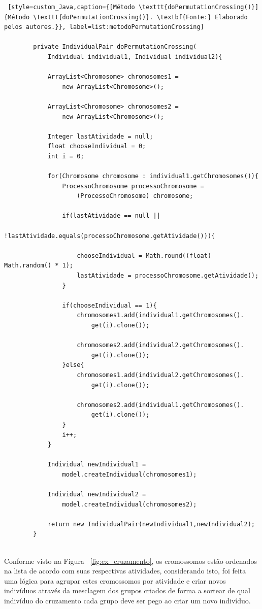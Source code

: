 \begin{lstlisting} [style=custom_Java,caption={[Método \texttt{doPermutationCrossing()}]{Método \texttt{doPermutationCrossing()}. \textbf{Fonte:} Elaborado pelos autores.}}, label=list:metodoPermutationCrossing] 

		private IndividualPair doPermutationCrossing(
			Individual individual1, Individual individual2){
			
			ArrayList<Chromosome> chromosomes1 = 
				new ArrayList<Chromosome>();
				
			ArrayList<Chromosome> chromosomes2 = 
				new ArrayList<Chromosome>();
				
			Integer lastAtividade = null;
			float chooseIndividual = 0;
			int i = 0;
			
			for(Chromosome chromosome : individual1.getChromosomes()){
				ProcessoChromosome processoChromosome = 
					(ProcessoChromosome) chromosome;
				
				if(lastAtividade == null || 
					!lastAtividade.equals(processoChromosome.getAtividade())){
					
					chooseIndividual = Math.round((float) Math.random() * 1);
					lastAtividade = processoChromosome.getAtividade();
				}
				
				if(chooseIndividual == 1){
					chromosomes1.add(individual1.getChromosomes().
						get(i).clone());
						
					chromosomes2.add(individual2.getChromosomes().
						get(i).clone());
				}else{
					chromosomes1.add(individual2.getChromosomes().
						get(i).clone());
						
					chromosomes2.add(individual1.getChromosomes().
						get(i).clone());
				}
				i++;
			}
			
			Individual newIndividual1 = 
				model.createIndividual(chromosomes1);
				
			Individual newIndividual2 = 
				model.createIndividual(chromosomes2);
			
			return new IndividualPair(newIndividual1,newIndividual2);
		}
	

\end{lstlisting}

\par Conforme visto na Figura  ~\ref{fig:ex_cruzamento}, os cromossomos estão ordenados na lista de acordo com suas respectivas atividades, considerando isto, foi feita uma lógica para agrupar estes cromossomos por atividade e criar novos indivíduos através da mesclagem dos grupos criados de forma a sortear de qual indivíduo do cruzamento cada grupo deve ser pego ao criar um novo indivíduo. 

